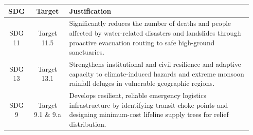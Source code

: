 \documentclass[12pt,oneside]{report}
\begin{document}
\vspace{0.05cm}

\noindent
\begin{tabularx}{\textwidth}{|c|c|X|}
\hline
\textbf{SDG} & \textbf{Target} & \textbf{Justification} \\ \hline

SDG 11
& Target 11.5
& Significantly reduces the number of deaths and people affected by water-related disasters and landslides through proactive evacuation routing to safe high-ground sanctuaries. \\ \hline

SDG 13
& Target 13.1
& Strengthens institutional and civil resilience and adaptive capacity to climate-induced hazards and extreme monsoon rainfall deluges in vulnerable geographic regions. \\ \hline

SDG 9
& Target 9.1 \& 9.a
& Develops resilient, reliable emergency logistics infrastructure by identifying transit choke points and designing minimum-cost lifeline supply trees for relief distribution. \\ \hline

\end{tabularx}

\clearpage
\end{document}
